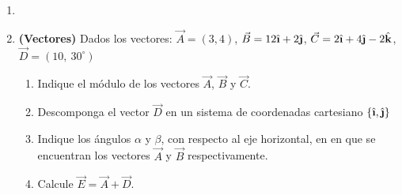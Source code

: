 \documentclass[letterpaper,11pt]{article}
\newcommand{\ihat}{\hat{\textbf{\i}}}
\newcommand{\jhat}{\hat{\textbf{\j}}}
\newcommand{\khat}{\hat{\textbf{k}}}
\begin{document}
\vspace{-1cm}
\begin{enumerate}\setlength{\itemsep}{0.4cm}\addtocounter{enumi}{-1}


\item[]


\item \textbf{(Vectores)} Dados los vectores: $\Vec{A} = (3,4)$, $\Vec{B} = 12 \ihat + 2 \jhat$, $\Vec{C} = 2 \ihat + 4\jhat - 2 \khat$, $\Vec{D}= (10, \ 30^\circ)$
    
    \begin{enumerate}
        \item Indique el módulo de los vectores $\Vec{A}$, $\Vec{B}$ y $\Vec{C}$.
        
        \item Descomponga el vector $\Vec{D}$ en un sistema de coordenadas cartesiano $\{\ihat, \jhat\}$ 
        
        \item Indique los ángulos $\alpha$ y $\beta$, con respecto al eje horizontal, en en que se encuentran los vectores $\Vec{A}$ y $\Vec{B}$ respectivamente.
        
        \item Calcule $\Vec{E} = \Vec{A} + \Vec{D}$.
        
    \end{enumerate}

        
        
                

\end{enumerate}
\end{document}
